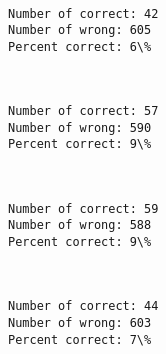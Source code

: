 \documentclass[11pt]{article}
\begin{document}
    \begin{center}
    \end{center}
    { \hspace*{\fill} \\}
    
    \begin{Verbatim}[commandchars=\\\{\}]
Number of correct: 42
Number of wrong: 605
Percent correct: 6\%

    \end{Verbatim}

    \begin{center}
    \end{center}
    { \hspace*{\fill} \\}
    
    \begin{Verbatim}[commandchars=\\\{\}]
Number of correct: 57
Number of wrong: 590
Percent correct: 9\%

    \end{Verbatim}

    \begin{center}
    \end{center}
    { \hspace*{\fill} \\}
    
    \begin{Verbatim}[commandchars=\\\{\}]
Number of correct: 59
Number of wrong: 588
Percent correct: 9\%

    \end{Verbatim}

    \begin{center}
    \end{center}
    { \hspace*{\fill} \\}
    
    \begin{Verbatim}[commandchars=\\\{\}]
Number of correct: 44
Number of wrong: 603
Percent correct: 7\%

    \end{Verbatim}
\end{document}
